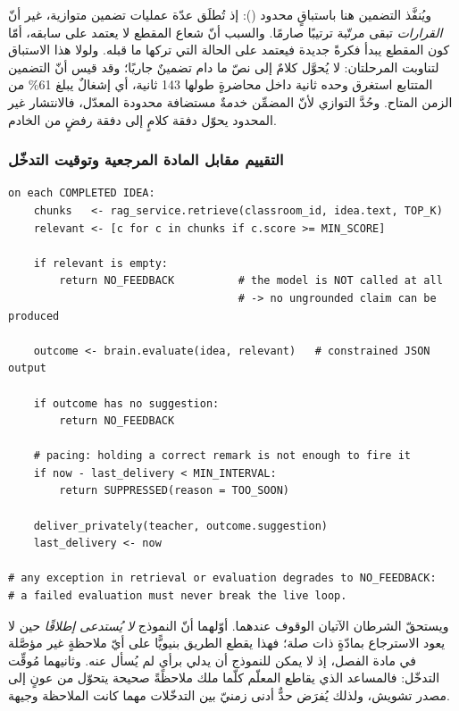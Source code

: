 ويُنفَّذ التضمين هنا باستباقٍ محدود (): إذ تُطلَق عدّة عمليات تضمين متوازية، غير أنّ \emph{القرارات} تبقى مرتّبة ترتيبًا صارمًا. والسبب أنّ شعاع المقطع لا يعتمد على سابقه، أمّا كون المقطع يبدأ فكرةً جديدة فيعتمد على الحالة التي تركها ما قبله. ولولا هذا الاستباق لتناوبت المرحلتان: لا يُحوَّل كلامٌ إلى نصّ ما دام تضمينٌ جاريًا؛ وقد قيس أنّ التضمين المتتابع استغرق وحده  ثانية داخل محاضرةٍ طولها 143 ثانية، أي إشغالٌ يبلغ 61\% من الزمن المتاح. وحُدَّ التوازي لأنّ المضمِّن خدمةٌ مستضافة محدودة المعدّل، فالانتشار غير المحدود يحوّل دفقة كلامٍ إلى دفقة رفضٍ من الخادم.

\subsubsection{التقييم مقابل المادة المرجعية وتوقيت التدخّل}

\begin{english}
\begin{lstlisting}[caption={},captionpos=b]
on each COMPLETED IDEA:
    chunks   <- rag_service.retrieve(classroom_id, idea.text, TOP_K)
    relevant <- [c for c in chunks if c.score >= MIN_SCORE]

    if relevant is empty:
        return NO_FEEDBACK          # the model is NOT called at all
                                    # -> no ungrounded claim can be produced

    outcome <- brain.evaluate(idea, relevant)   # constrained JSON output

    if outcome has no suggestion:
        return NO_FEEDBACK

    # pacing: holding a correct remark is not enough to fire it
    if now - last_delivery < MIN_INTERVAL:
        return SUPPRESSED(reason = TOO_SOON)

    deliver_privately(teacher, outcome.suggestion)
    last_delivery <- now

# any exception in retrieval or evaluation degrades to NO_FEEDBACK:
# a failed evaluation must never break the live loop.
\end{lstlisting}
\end{english}

ويستحقّ الشرطان الآتيان الوقوف عندهما. أوّلهما أنّ النموذج \emph{لا يُستدعى إطلاقًا} حين لا يعود الاسترجاع بمادّةٍ ذات صلة؛ فهذا يقطع الطريق بنيويًّا على أيّ ملاحظةٍ غير مؤصَّلة في مادة الفصل، إذ لا يمكن للنموذج أن يدلي برأيٍ لم يُسأل عنه. وثانيهما مُوقِّت التدخّل: فالمساعد الذي يقاطع المعلّم كلّما ملك ملاحظةً صحيحة يتحوّل من عونٍ إلى مصدر تشويش، ولذلك يُفرَض حدٌّ أدنى زمنيّ بين التدخّلات مهما كانت الملاحظة وجيهة.

